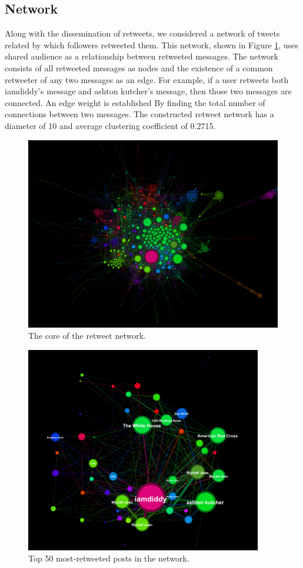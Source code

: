 \documentclass[a4paper, 11pt, titlepage]{article}
\begin{document}
\subsection{Network}

Along with the dissemination of retweets, we considered a network of tweets related by which followers retweeted them.  This network, shown in Figure \ref{fig:rt_net_core}, uses shared audience as a relationship between retweeted messages.  The network consists of all retweeted messages as nodes and the existence of a common retweeter of any two messages as an edge.  For example, if a user retweets both iamdiddy's message and ashton kutcher's message, then those two messages are connected.  An edge weight is established By finding the total number of connections between two messages.  The constructed retweet network has a diameter of 10 and average clustering coefficient of 0.2715.

\begin{figure}[h]
\centering
\includegraphics[width=120mm]{../figures/rt_net_core}
\caption{The core of the retweet network.}
\label{fig:rt_net_core}
\end{figure}

\begin{figure}[h]
\centering
\includegraphics[height=90mm]{../figures/rt_net_top_50_labels}
\caption{Top 50 most-retweeted posts in the network.}
\label{fig:rt_net_top_50}
\end{figure}
\end{document}
